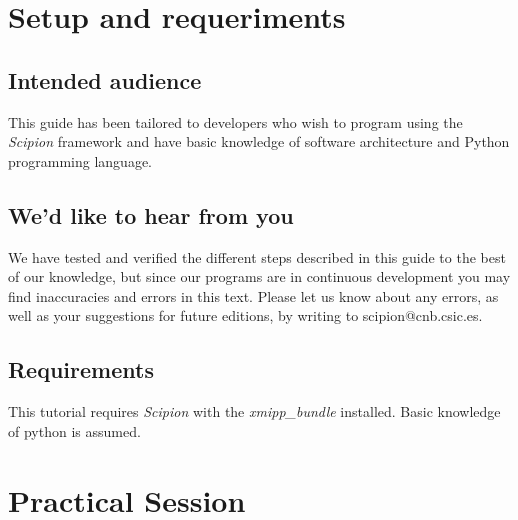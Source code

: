 \documentclass[12pt]{article} %
\def\scipion{\textit{Scipion}\xspace}
\begin{document}
\begin{versionhistory}
\end{versionhistory}\newpage


\tableofcontents %

\newpage %


\section{Setup and requeriments}
\subsection{Intended audience}
This guide has been tailored to developers who wish to program using the \scipion 
framework and have basic knowledge of software architecture and Python programming language. 

\subsection{We'd like to hear from you}

We have tested and verified the different steps described in this guide
to the best of our knowledge, but since our programs are in continuous
development you may find inaccuracies and errors in this text. Please
let us know about any errors, as well as your suggestions for
future editions, by writing to
scipion@cnb.csic.es.


\subsection{Requirements}

This tutorial requires \scipion with the \textit{xmipp\_bundle} installed. Basic knowledge of python is assumed.


\section{Practical Session}
\end{document}
